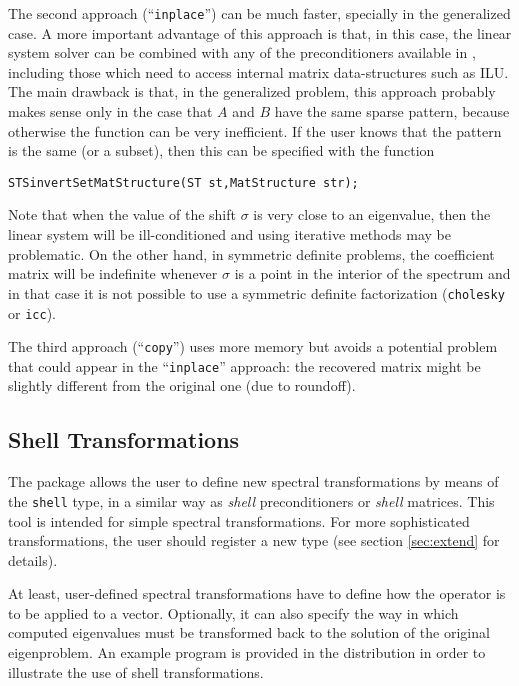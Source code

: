 	The second approach (``\Verb!inplace!'') can be much faster, specially in the generalized case. A more important advantage of this approach is that, in this case, the linear system solver can be combined with any of the preconditioners available in \petsc, including those which need to access internal matrix data-structures such as ILU. The main drawback is that, in the generalized problem, this approach probably makes sense only in the case that $A$ and $B$ have the same sparse pattern, because otherwise the function  can be very inefficient. 
If the user knows that the pattern is the same (or a subset), then this can be specified with the function
	\begin{Verbatim}[fontsize=\small]
	STSinvertSetMatStructure(ST st,MatStructure str);
	\end{Verbatim}
	
	Note that when the value of the shift $\sigma$ is very close to an eigenvalue, then the linear system will be ill-conditioned and using iterative methods may be problematic. On the other hand, in symmetric definite problems, the coefficient matrix will be indefinite whenever $\sigma$ is a point in the interior of the spectrum and in that case it is not possible to use a symmetric definite factorization (\texttt{cholesky} or \texttt{icc}).

	The third approach (``\Verb!copy!'') uses more memory but avoids a potential problem that could appear in the ``\Verb!inplace!'' approach: the recovered matrix might be slightly different from the original one (due to roundoff).

\subsection{Shell Transformations}
\label{sec:shell}

	The  package allows the user to define new spectral transformations by means of the \texttt{shell} type, in a similar way as \emph{shell} preconditioners or \emph{shell} matrices. This tool is intended for simple spectral transformations. For more sophisticated transformations, the user should register a new  type (see section \ref{sec:extend} for details).

	At least, user-defined spectral transformations have to define how the operator is to be applied to a vector. Optionally, it can also specify the way in which computed eigenvalues must be transformed back to the solution of the original eigenproblem. An example program is provided in the \slepc distribution in order to illustrate the use of shell transformations.

